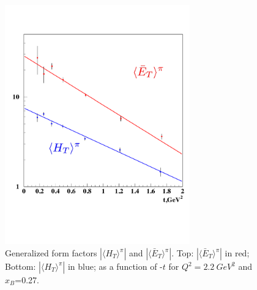 \documentclass[prc,floatfix,superscriptaddress]{revtex4}
\newcommand{\GPDHT}{\langle H_T \rangle}
\newcommand{\GPDETbar}{\langle \bar{E}_T \rangle}
\begin{document}
\begin{figure}[h!]
\vspace*{-10 mm}
\centerline{
\includegraphics[width=8cm]{ht_et_pi.pdf}
}
\vspace*{-25 mm}
\caption
{
Generalized form factors $|\GPDHT^\pi|$   and $|\GPDETbar^\pi|$. 
Top: $|\GPDETbar^\pi|$ in red; 
Bottom: $|\GPDHT^\pi|$ in blue;
as a function of -$t$ for $Q^2=2.2~GeV^2$  and $x_B$=0.27.
}
\label{fig:ht_et_pi0}
\end{figure}


\end{document}
